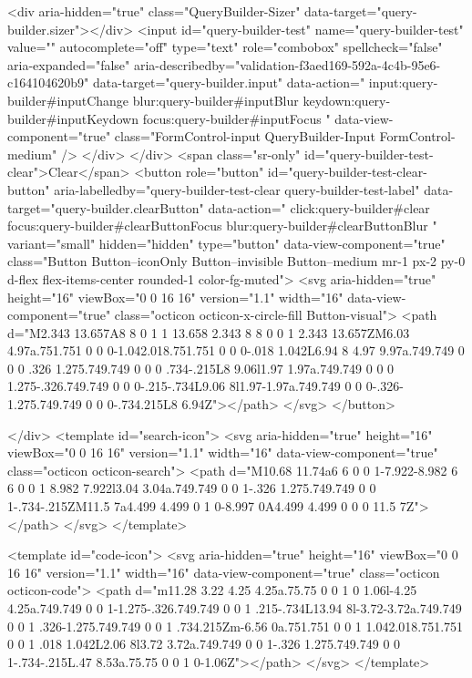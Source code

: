             <div aria-hidden="true" class="QueryBuilder-Sizer" data-target="query-builder.sizer"></div>
            <input id="query-builder-test" name="query-builder-test" value="" autocomplete="off" type="text" role="combobox" spellcheck="false" aria-expanded="false" aria-describedby="validation-f3aed169-592a-4c4b-95e6-c164104620b9" data-target="query-builder.input" data-action="
          input:query-builder#inputChange
          blur:query-builder#inputBlur
          keydown:query-builder#inputKeydown
          focus:query-builder#inputFocus
        " data-view-component="true" class="FormControl-input QueryBuilder-Input FormControl-medium" />
          </div>
        </div>
          <span class="sr-only" id="query-builder-test-clear">Clear</span>
          <button role="button" id="query-builder-test-clear-button" aria-labelledby="query-builder-test-clear query-builder-test-label" data-target="query-builder.clearButton" data-action="
                click:query-builder#clear
                focus:query-builder#clearButtonFocus
                blur:query-builder#clearButtonBlur
              " variant="small" hidden="hidden" type="button" data-view-component="true" class="Button Button--iconOnly Button--invisible Button--medium mr-1 px-2 py-0 d-flex flex-items-center rounded-1 color-fg-muted">  <svg aria-hidden="true" height="16" viewBox="0 0 16 16" version="1.1" width="16" data-view-component="true" class="octicon octicon-x-circle-fill Button-visual">
    <path d="M2.343 13.657A8 8 0 1 1 13.658 2.343 8 8 0 0 1 2.343 13.657ZM6.03 4.97a.751.751 0 0 0-1.042.018.751.751 0 0 0-.018 1.042L6.94 8 4.97 9.97a.749.749 0 0 0 .326 1.275.749.749 0 0 0 .734-.215L8 9.06l1.97 1.97a.749.749 0 0 0 1.275-.326.749.749 0 0 0-.215-.734L9.06 8l1.97-1.97a.749.749 0 0 0-.326-1.275.749.749 0 0 0-.734.215L8 6.94Z"></path>
</svg>
</button>

      </div>
      <template id="search-icon">
  <svg aria-hidden="true" height="16" viewBox="0 0 16 16" version="1.1" width="16" data-view-component="true" class="octicon octicon-search">
    <path d="M10.68 11.74a6 6 0 0 1-7.922-8.982 6 6 0 0 1 8.982 7.922l3.04 3.04a.749.749 0 0 1-.326 1.275.749.749 0 0 1-.734-.215ZM11.5 7a4.499 4.499 0 1 0-8.997 0A4.499 4.499 0 0 0 11.5 7Z"></path>
</svg>
</template>

<template id="code-icon">
  <svg aria-hidden="true" height="16" viewBox="0 0 16 16" version="1.1" width="16" data-view-component="true" class="octicon octicon-code">
    <path d="m11.28 3.22 4.25 4.25a.75.75 0 0 1 0 1.06l-4.25 4.25a.749.749 0 0 1-1.275-.326.749.749 0 0 1 .215-.734L13.94 8l-3.72-3.72a.749.749 0 0 1 .326-1.275.749.749 0 0 1 .734.215Zm-6.56 0a.751.751 0 0 1 1.042.018.751.751 0 0 1 .018 1.042L2.06 8l3.72 3.72a.749.749 0 0 1-.326 1.275.749.749 0 0 1-.734-.215L.47 8.53a.75.75 0 0 1 0-1.06Z"></path>
</svg>
</template>


